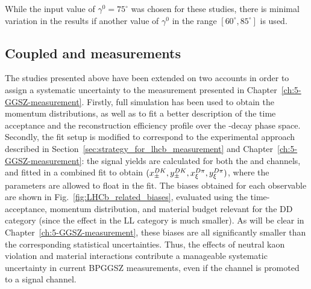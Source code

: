 While the input value of $\gamma^0=75^\circ$ was chosen for these studies, there is minimal variation in the results if another value of $\gamma^0$ in the range $[60^\circ, 85^\circ]$ is used.


\subsection{\texorpdfstring{Coupled \BtoDK and \BtoDpi measurements}
{Coupled B->DK and B->Dpi measurements}}%
\label{sub:the_impact_on_coupled_btodk_and_btodpi_measurements}

The studies presented above have been extended on two accounts in order to assign a systematic uncertainty to the \lhcb measurement presented in Chapter~\ref{ch:5-GGSZ-measurement}. Firstly, full \lhcb simulation has been used to obtain the momentum distributions, as well as to fit a better description of the time acceptance and the reconstruction efficiency profile over the \D-decay phase space. Secondly, the fit setup is modified to correspond to the experimental approach described in Section~\ref{sec:strategy_for_lhcb_measurement} and Chapter~\ref{ch:5-GGSZ-measurement}: the signal yields are calculated for both the \BtoDK and \BtoDpi channels, and fitted in a combined fit to obtain $(x_\pm^{{D}{K}}, y_\pm^{{D}{K}}, x_\xi^{{D}\pi}, y_\xi^{{D}\pi})$, where the \Fi parameters are allowed to float in the fit. The biases obtained for each observable are shown in Fig.~\ref{fig:LHCb_related_biases}, evaluated using the time-acceptance, momentum distribution, and material budget relevant for the DD category (since the effect in the LL category is much smaller). As will be clear in Chapter~\ref{ch:5-GGSZ-measurement}, these biases are all significantly smaller than the corresponding statistical uncertainties. Thus, the effects of neutral kaon \CP violation and material interactions contribute a manageable systematic uncertainty in current BPGGSZ measurements, even if the \BtoDpi channel is promoted to a signal channel.

